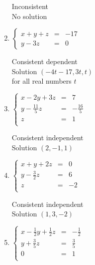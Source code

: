 \documentclass{ximera}
\begin{document}
\begin{enumerate}
Inconsistent\\
No solution



\item $\left\{ \begin{array}{rcr} x + y + z & = & -17  \\ y - 3z & = & 0  \end{array} \right.$
\vspace{.25in}

Consistent dependent\\
Solution $(-4t - 17, 3t, t)$\\
for all real numbers $t$


\item $\left\{ \begin{array}{rcr} x-2y+3z & = & 7  \\ y - \frac{11}{5}z & = & -\frac{16}{5} \\ z & = & 1 \\  \end{array} \right.$
\vspace{.25in}

Consistent independent\\
Solution $(2,-1,1)$


\item $\left\{ \begin{array}{rcr} x+y+2z & = & 0  \\ y - \frac{3}{2}z & = & 6 \\ z & = & -2 \\  \end{array} \right.$
\vspace{.25in}

Consistent independent\\
Solution $(1,3,-2)$



\item $\left\{ \begin{array}{rcr} x - \frac{1}{2} y + \frac{1}{2} z & = & -\frac{1}{2}  \\ [3pt] y + \frac{3}{5} z & = & \frac{3}{5} \\ 0 & = & 1 \\  \end{array} \right.$
\vspace{.25in}


\end{enumerate}
\end{document}

